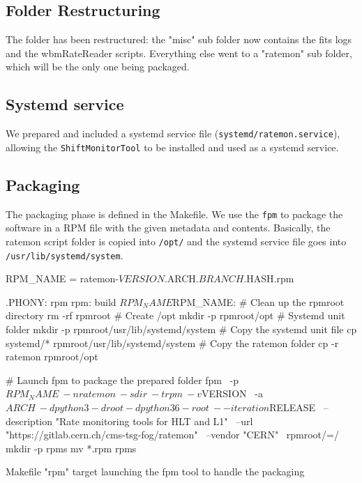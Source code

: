\subsection{Folder Restructuring}

The folder has been restructured: the "misc" sub folder now contains the fits logs and the wbmRateReader scripts. Everything else went to a "ratemon" sub folder, which will be the only one being packaged.

\subsection{Systemd service}

We prepared and included a systemd service file (\texttt{systemd/ratemon.service}), allowing the \texttt{ShiftMonitorTool} to be installed and used as a systemd service.

\subsection{Packaging}

The packaging phase is defined in the Makefile. We use the \texttt{fpm} \cite{fpm-packager} to package the software in a RPM file with the given metadata and contents. Basically, the ratemon script folder is copied into \texttt{/opt/} \cite{FilesystemHierarchyStandard-2015-05-20} and the systemd service file goes into \texttt{/usr/lib/systemd/system}.

\begin{listing}[ht]
\begin{yamlcode}

RPM_NAME = ratemon-${VERSION}.${ARCH}.${BRANCH}.${HASH}.rpm

.PHONY: rpm
rpm: build ${RPM_NAME}
${RPM_NAME}:
  # Clean up the rpmroot directory
  rm -rf rpmroot
  # Create /opt
  mkdir -p rpmroot/opt
  # Systemd unit folder
  mkdir -p rpmroot/usr/lib/systemd/system
  # Copy the systemd unit file
  cp systemd/* rpmroot/usr/lib/systemd/system
  # Copy the ratemon folder
  cp -r ratemon rpmroot/opt

  # Launch fpm to package the prepared folder 
  fpm \
  -p ${RPM_NAME} \
  -n ratemon \
  -s dir \
  -t rpm \
  -v ${VERSION} \
  -a ${ARCH} \
  -d python3 -d root -d python36-root \
  --iteration ${RELEASE} \
  --description "Rate monitoring tools for HLT and L1" \
  --url "https://gitlab.cern.ch/cms-tsg-fog/ratemon" \
  --vendor "CERN" \
  rpmroot/=/
  mkdir -p rpms
  mv *.rpm rpms
\end{yamlcode}
\caption{Makefile "rpm" target launching the fpm tool to handle the packaging}
\end{listing}

